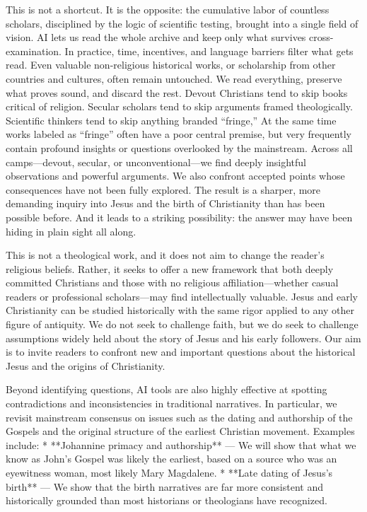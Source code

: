 This is not a shortcut.
It is the opposite: the cumulative labor of countless scholars, disciplined by the logic of scientific testing, brought into a single field of vision.
AI lets us read the whole archive and keep only what survives cross-examination.
In practice, time, incentives, and language barriers filter what gets read.
Even valuable non-religious historical works, or scholarship from other countries and cultures, often remain untouched.
We read everything, preserve what proves sound, and discard the rest.
Devout Christians tend to skip books critical of religion.
Secular scholars tend to skip arguments framed theologically.
Scientific thinkers tend to skip anything branded “fringe,”
At the same time works labeled as “fringe” often have a poor central premise, but very frequently contain profound insights or questions overlooked by the mainstream.
Across all camps—devout, secular, or unconventional—we find deeply insightful observations and powerful arguments.
We also confront accepted points whose consequences have not been fully explored.
The result is a sharper, more demanding inquiry into Jesus and the birth of Christianity than has been possible before.
And it leads to a striking possibility: the answer may have been hiding in plain sight all along.

This is not a theological work, and it does not aim to change the reader’s religious beliefs.
Rather, it seeks to offer a new framework that both deeply committed Christians and those with no religious affiliation—whether casual readers or professional scholars—may find intellectually valuable.
Jesus and early Christianity can be studied historically with the same rigor applied to any other figure of antiquity.
We do not seek to challenge faith, but we do seek to challenge assumptions widely held about the story of Jesus and his early followers.
Our aim is to invite readers to confront new and important questions about the historical Jesus and the origins of Christianity.

Beyond identifying questions, AI tools are also highly effective at spotting contradictions and inconsistencies in traditional narratives.
In particular, we revisit mainstream consensus on issues such as the dating and authorship of the Gospels and the original structure of the earliest Christian movement.
Examples include:
* **Johannine primacy and authorship** — We will show that what we know as John’s Gospel was likely the earliest, based on a source who was an eyewitness woman, most likely Mary Magdalene.
* **Late dating of Jesus’s birth** — We show that the birth narratives are far more consistent and historically grounded than most historians or theologians have recognized.

